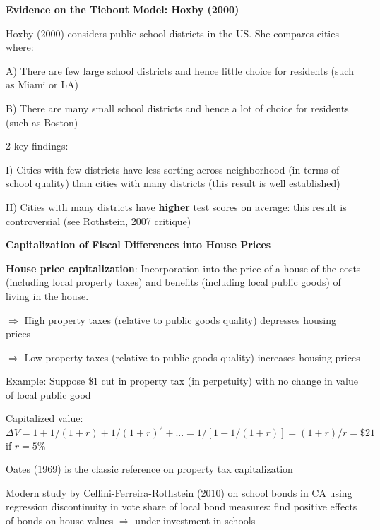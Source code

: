 \documentclass[landscape]{slides}
\begin{document}
\begin{slide}
\begin{center}
{\bf Evidence on the Tiebout Model: Hoxby (2000)}
\end{center}

Hoxby (2000) considers public school districts in the US. She
compares cities where:

A) There are few large school districts and hence little choice for residents (such as Miami or LA)

B) There are many small school districts and hence a lot of choice for residents (such as Boston)

2 key findings:

I) Cities with few districts have less sorting across neighborhood (in terms of school quality) than
cities with many districts (this result is well established)

II) Cities with many districts have {\bf higher} test scores on average:
this result is controversial (see Rothstein, 2007 critique)
\end{slide}



\begin{slide}
\begin{center}
{\bf Capitalization of Fiscal Differences into House Prices}
\end{center}


{\bf House price capitalization}:
Incorporation into the price of a house of the costs (including local property taxes) and benefits (including local public goods) of living in the house.

$\Rightarrow$ High property taxes (relative to public goods quality) depresses housing prices

$\Rightarrow$ Low property taxes (relative to public goods quality) increases housing prices

\small
Example: Suppose \$1 cut in property tax (in perpetuity) with no change in value of local public good

Capitalized value: $\Delta V = 1 + 1/(1+r) + 1/(1+r)^2 + ... = 1/[1-1/(1+r)]=(1+r)/r = \$21$ if $r=5\%$

Oates (1969) is the classic reference on property tax capitalization

Modern study by Cellini-Ferreira-Rothstein (2010) on school bonds in CA using regression discontinuity in vote share of local bond measures: find positive effects of bonds on house values $\Rightarrow$ under-investment in schools 

\end{slide}
\end{document}
